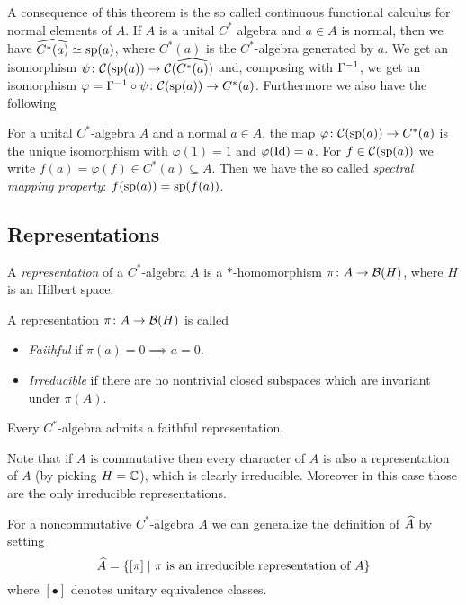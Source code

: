 \noindent A consequence of this theorem is the so called continuous functional calculus for normal elements of $A$. If $A$ is a unital $C^\ast$ algebra and $a\in A$ is normal, then we have $\wh{C^\ast(a)}\simeq\sp(a)$, where $C^\ast(a)$ is the $C^\ast$-algebra generated by $a$. We get an isomorphism $\psi\colon\Co(\sp(a))\to\Co(\wh{C^\ast(a)})$ and, composing with $\G^{-1}$, we get an isomorphism $\varphi=\G^{-1}\circ\psi\colon\Co(\sp(a))\to C^\ast(a)$. Furthermore we also have the following
\begin{theorem}
 For a unital $C^\ast$-algebra $A$ and a normal $a\in A$, the map $\varphi\colon\Co(\sp(a))\to C^\ast(a)$ is the unique isomorphism with $\varphi(1)=1$ and $\varphi(\Id)=a$. For $f\in\Co(\sp(a))$ we write $f(a)=\varphi(f)\in C^\ast(a)\subseteq A$. Then we have the so called \emph{spectral mapping property}: $f(\sp(a))=\sp(f(a))$.
\end{theorem}

\subsection{Representations}
\begin{definition}
 A \emph{representation} of a $C^\ast$-algebra $A$ is a $\ast$-homomorphism $\pi\colon A\to\B(H)$, where $H$ is an Hilbert space.
\end{definition}
\begin{definition}
 A representation $\pi\colon A\to\B(H)$ is called
 \begin{itemize}
  \item \emph{Faithful} if $\pi(a)=0\implies a=0$.
  \item \emph{Irreducible} if there are no nontrivial closed subspaces which are invariant under $\pi(A)$. 
 \end{itemize}
\end{definition}

\begin{theorem}
 Every $C^\ast$-algebra admits a faithful representation.
\end{theorem}

\noindent Note that if $A$ is commutative then every character of $A$ is also a representation of $A$ (by picking $H=\C$), which is clearly irreducible. Moreover in this case those are the only irreducible representations.

\noindent For a noncommutative $C^\ast$-algebra $A$ we can generalize the definition of $\wh{A}$ by setting $$\wh{A}=\{[\pi]\mid\pi\text{ is an irreducible representation of }A\}$$ where $[\bullet]$ denotes unitary equivalence classes.

